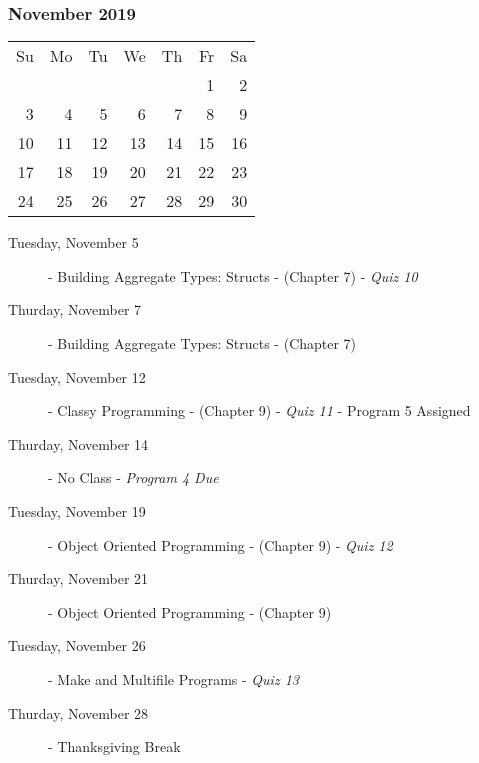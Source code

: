 \subsubsection*{November 2019}
\begin{tabular}{rrrrrrr}
Su & Mo & Tu & We & Th & Fr & Sa\\
   &    &    &    &    &  1 &  2\\
 3 &  4 &  5 &  6 &  7 &  8 &  9\\
10 & 11 & 12 & 13 & 14 & 15 & 16\\
17 & 18 & 19 & 20 & 21 & 22 & 23\\
24 & 25 & 26 & 27 & 28 & 29 & 30\\
\end{tabular}
\begin{description}
\item[Tuesday, November 5]
  - Building Aggregate Types: Structs
  \newline- (Chapter 7)
  \newline- {\em Quiz 10}
\item[Thurday, November 7]
  - Building Aggregate Types: Structs
  \newline- (Chapter 7)

\item[Tuesday, November 12]
  - Classy Programming
  \newline- (Chapter 9)
  \newline- {\em Quiz 11}
  \newline- Program 5 Assigned
\item[Thurday, November 14] - No Class
  \newline- {\em Program 4 Due}

\item[Tuesday, November 19]
  - Object Oriented Programming
  \newline- (Chapter 9)
  \newline- {\em Quiz 12}
\item[Thurday, November 21]
  - Object Oriented Programming
  \newline- (Chapter 9)

\item[Tuesday, November 26]
  - Make and Multifile Programs
  \newline- {\em Quiz 13}
\item[Thurday, November 28] - Thanksgiving Break
\end{description}

